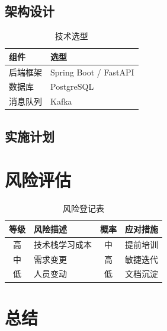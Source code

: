 \subsection{架构设计}



\begin{table}[H]
\centering
\caption{技术选型}
\begin{tabularx}{\linewidth}{|l|X|}
\hline
\textbf{组件} & \textbf{选型} \\ \hline
后端框架 & Spring Boot / FastAPI \\ \hline
数据库 & PostgreSQL \\ \hline
消息队列 & Kafka \\ \hline
\end{tabularx}
\end{table}

\subsection{实施计划}

%

\section{风险评估}

\begin{table}[H]
\centering
\caption{风险登记表}
\begin{tabularx}{\linewidth}{|c|X|c|X|}
\hline
\textbf{等级} & \textbf{风险描述} & \textbf{概率} & \textbf{应对措施} \\ \hline
高 & 技术栈学习成本 & 中 & 提前培训 \\ \hline
中 & 需求变更 & 高 & 敏捷迭代 \\ \hline
低 & 人员变动 & 低 & 文档沉淀 \\ \hline
\end{tabularx}
\end{table}

\section{总结}


